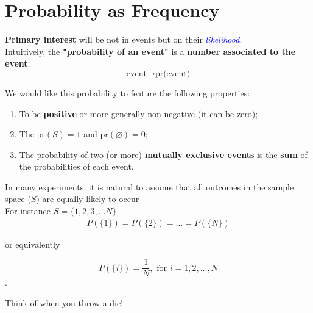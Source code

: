 \documentclass[notes=show]{beamer}\usepackage[]{graphicx}\usepackage[]{color}
\newcommand{\bea}{\begin{eqnarray}}
\newcommand{\eea}{\end{eqnarray}}
\begin{document}
\section{Probability as Frequency}

\begin{frame}{\secname}

\textbf{Primary interest} will be not in events  but on their \textcolor{blue}{\textit{likelihood}}.\\[0.5em]
\pause
Intuitively, the \textbf{"probability of an event"} is a \textbf{number associated to the event}:\\[0.5em]

$$\text{event} \rightarrow \text{pr(event)}$$

\pause
We would like this probability to feature the following properties:

\begin{enumerate}
\item To be \textbf{positive} or more generally non-negative (it can be zero);
\pause
\item The $\text{pr}(S)=1$ and $\text{pr}(\varnothing)=0$;
\pause
\item The probability of two (or more) \textbf{mutually exclusive events} is the \textbf{sum} of the probabilities of each event.
\end{enumerate}

\end{frame}

\begin{frame}{\secname}

In many experiments, it is natural to assume that all outcomes in the sample space ($S$) are equally likely to occur\\[0.5em]

For instance $S=\{1,2,3,...N\}$\\[0.5em]
\pause
\bea
P(\{1\})=P(\{2\})=...=P(\{N\}) \nonumber
\eea

or equivalently

$$P(\{i\})= \frac{1}{N}, \text{ for } i=1,2,...,N$$.

\pause

\begin{example}
\begin{center}
Think of when you throw a die!
\end{center}
\end{example}
\end{frame}
\end{document}
